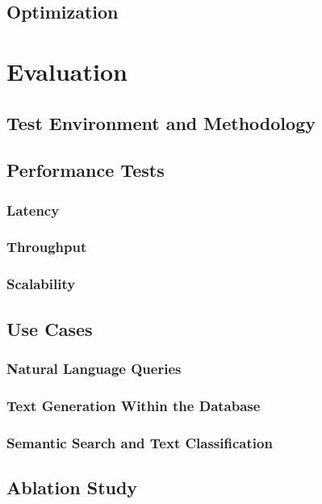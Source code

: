 \documentclass{article}
\begin{document}
\subsection{Optimization}

\newpage

\section{Evaluation}


\subsection{Test Environment and Methodology}

\subsection{Performance Tests}
\subsubsection{Latency}
\subsubsection{Throughput}
\subsubsection{Scalability}

\subsection{Use Cases}
\subsubsection{Natural Language Queries}
\subsubsection{Text Generation Within the Database}
\subsubsection{Semantic Search and Text Classification}

\subsection{Ablation Study}
\end{document}
